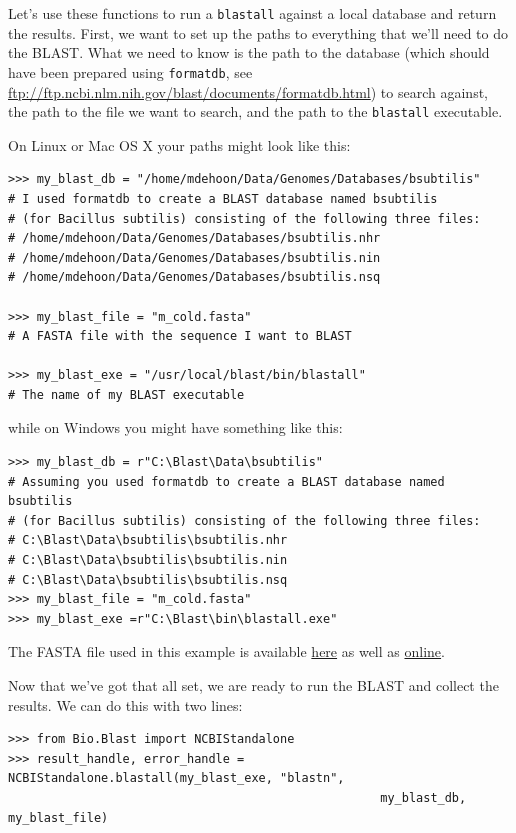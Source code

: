 \documentclass{report}
\begin{document}
Let's use these functions to run a \verb|blastall| against a local database and return the results. First, we want to set up the paths to everything that we'll need to do the BLAST. What we need to know is the path to the database (which should have been prepared using \verb|formatdb|, see \url{ftp://ftp.ncbi.nlm.nih.gov/blast/documents/formatdb.html}) to search against, the path to the file we want to search, and the path to the \verb|blastall| executable.

On Linux or Mac OS X your paths might look like this:

\begin{verbatim}
>>> my_blast_db = "/home/mdehoon/Data/Genomes/Databases/bsubtilis"
# I used formatdb to create a BLAST database named bsubtilis
# (for Bacillus subtilis) consisting of the following three files:
# /home/mdehoon/Data/Genomes/Databases/bsubtilis.nhr
# /home/mdehoon/Data/Genomes/Databases/bsubtilis.nin
# /home/mdehoon/Data/Genomes/Databases/bsubtilis.nsq

>>> my_blast_file = "m_cold.fasta"
# A FASTA file with the sequence I want to BLAST

>>> my_blast_exe = "/usr/local/blast/bin/blastall"
# The name of my BLAST executable
\end{verbatim}

\noindent while on Windows you might have something like this:

\begin{verbatim}
>>> my_blast_db = r"C:\Blast\Data\bsubtilis"
# Assuming you used formatdb to create a BLAST database named bsubtilis
# (for Bacillus subtilis) consisting of the following three files:
# C:\Blast\Data\bsubtilis\bsubtilis.nhr
# C:\Blast\Data\bsubtilis\bsubtilis.nin
# C:\Blast\Data\bsubtilis\bsubtilis.nsq
>>> my_blast_file = "m_cold.fasta"
>>> my_blast_exe =r"C:\Blast\bin\blastall.exe"
\end{verbatim}

The FASTA file used in this example is available
\href{examples/m\_cold.fasta}{here} as well as
\href{http://biopython.org/DIST/docs/tutorial/examples/m\_cold.fasta}{online}.

Now that we've got that all set, we are ready to run the BLAST and collect the results. We can do this with two lines:

\begin{verbatim}
>>> from Bio.Blast import NCBIStandalone
>>> result_handle, error_handle = NCBIStandalone.blastall(my_blast_exe, "blastn",
                                                    my_blast_db, my_blast_file)
\end{verbatim}
\end{document}
